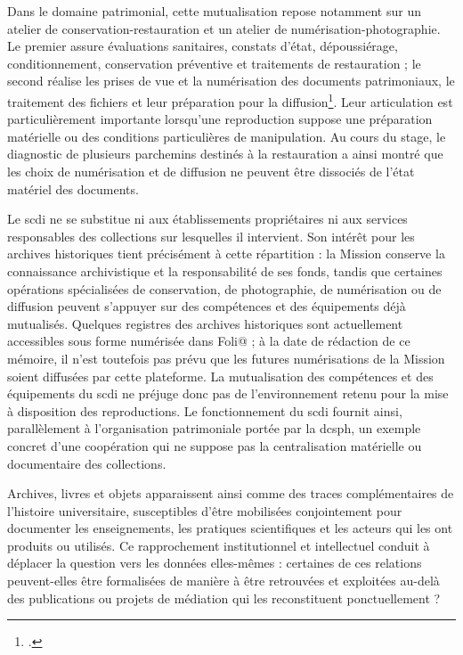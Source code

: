 Dans le domaine patrimonial, cette mutualisation repose notamment sur un atelier de conservation-restauration et un atelier de numérisation-photographie. Le premier assure évaluations sanitaires, constats d'état, dépoussiérage, conditionnement, conservation préventive et traitements de restauration ; le second réalise les prises de vue et la numérisation des documents patrimoniaux, le traitement des fichiers et leur préparation pour la diffusion\footcite{LorblanchetAteliers2024}. Leur articulation est particulièrement importante lorsqu'une reproduction suppose une préparation matérielle ou des conditions particulières de manipulation. Au cours du stage, le diagnostic de plusieurs parchemins destinés à la restauration a ainsi montré que les choix de numérisation et de diffusion ne peuvent être dissociés de l'état matériel des documents.

Le \gls{scdi} ne se substitue ni aux établissements propriétaires ni aux services responsables des collections sur lesquelles il intervient. Son intérêt pour les archives historiques tient précisément à cette répartition : la Mission conserve la connaissance archivistique et la responsabilité de ses fonds, tandis que certaines opérations spécialisées de conservation, de photographie, de numérisation ou de diffusion peuvent s'appuyer sur des compétences et des équipements déjà mutualisés. Quelques registres des archives historiques sont actuellement accessibles sous forme numérisée dans Foli@ ; à la date de rédaction de ce mémoire, il n'est toutefois pas prévu que les futures numérisations de la Mission soient diffusées par cette plateforme. La mutualisation des compétences et des équipements du \gls{scdi} ne préjuge donc pas de l'environnement retenu pour la mise à disposition des reproductions. Le fonctionnement du \gls{scdi} fournit ainsi, parallèlement à l'organisation patrimoniale portée par la \gls{dcsph}, un exemple concret d'une coopération qui ne suppose pas la centralisation matérielle ou documentaire des collections.

Archives, livres et objets apparaissent ainsi comme des traces complémentaires de l'histoire universitaire, susceptibles d'être mobilisées conjointement pour documenter les enseignements, les pratiques scientifiques et les acteurs qui les ont produits ou utilisés. Ce rapprochement institutionnel et intellectuel conduit à déplacer la question vers les données elles-mêmes : certaines de ces relations peuvent-elles être formalisées de manière à être retrouvées et exploitées au-delà des publications ou projets de médiation qui les reconstituent ponctuellement ?


